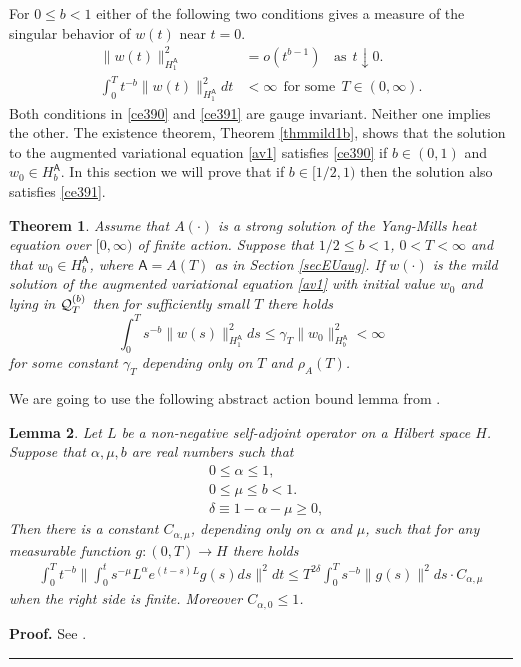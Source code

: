 \documentclass[12pt]{article}
\newtheorem{theorem}{Theorem}[section]
\newtheorem{lemma}[theorem]{Lemma}
\newenvironment{proof}[1][Proof]{\textbf{#1.} }{\ \rule{0.5em}{0.5em}}
\def \As{\mathsf{A}}
\def \Q{{\cal Q}}
\def \beq{\begin{equation}}
\def \eeq{\end{equation}}
\def \eref{\eqref}
\numberwithin{equation}{section}
\begin{document}
\bigskip
For $0 \le b <1$ either of the following two conditions gives a measure of the 
 singular behavior of $w(t)$ near $t =0$. 
\begin{align}
\|w(t)\|_{H_1^\As}^2 &= o(t^{b-1})\ \ \ \ \text{as} \ \ t\downarrow 0.  \label{ce390}\\
\int_0^T t^{-b} \|w(t)\|_{H_1^\As}^2 dt &< \infty \ \ \text{for some}\ \ T \in (0, \infty).             \label{ce391}
\end{align}
Both conditions  in \eref{ce390} and \eref{ce391} are gauge invariant. 
Neither one implies the other. 
 The existence theorem, Theorem \ref{thmmild1b}, shows that the solution to the augmented 
 variational equation  \eref{av1} satisfies \eref{ce390} if $b \in (0,1)$ 
 and $w_0 \in H_b^\As$.
In this section we will prove that  if $b \in [1/2, 1)$  then the solution also satisfies \eref{ce391}.

\begin{theorem}\label{thmact1} 
 Assume that $A(\cdot)$ is a strong solution of the Yang-Mills heat equation over $[0,\infty)$ of finite action.
Suppose that $1/2 \le b <1$, $0< T <\infty$ and that $w_0 \in H_b^\As$, where $\As = A(T)$ as in
    Section \ref{secEUaug}.
If $w(\cdot)$ 
is  the mild solution of the augmented variational equation \eref{av1} with initial value $w_0$ 
and lying in $\Q_T^{(b)}$ then  for sufficiently small $T$ there holds
\beq
\ \ \ \qquad \qquad \int_0^T s^{-b} \| w(s)\|_{H_1^\As}^2 ds  \le \gamma_T \|w_0\|_{H_b^\As}^2< \infty
                                        \qquad \qquad\qquad       \label{ce401}
\eeq
for some constant $\gamma_T$ depending only on $T$ and $\rho_A(T)$.    
\end{theorem}

We are going to use the following abstract action bound lemma from \cite{G70}.

\begin{lemma} \label{thmactint} Let $L$ be a non-negative
  self-adjoint operator on a Hilbert space $H$. Suppose that $\alpha, \mu, b$ are real numbers
  such that
  \begin{align}
 &0 \le \alpha \le 1,                                                      \label{ce300}\\          
& 0\le  \mu \le b < 1.                                                    \label{ce302}               \\ 
 &\delta \equiv 1-\alpha - \mu \ge0,                              \label{ce301}
    \end{align}
  Then there is a constant $C_{\alpha,\mu}$, depending only on $\alpha$ and $\mu$,
   such that for any measurable function $g:(0,T)\rightarrow H$ there holds
  \begin{align}
 \int_0^T t^{-b} \Big\|\int_0^t s^{-\mu} L^\alpha e^{(t-s)L} g(s) ds\Big\|^2 dt 
 \le T^{2\delta}\int_0^T s^{-b} \| g(s)\|^2 ds \cdot  C_{\alpha,\mu} \label{ce303}
 \end{align} 
 when the right side is finite.
 Moreover $C_{\alpha, 0} \le 1$.
  \end{lemma}  
       \begin{proof} See \cite[Theorem 3.19]{G70} . 
  \end{proof}
\end{document}

